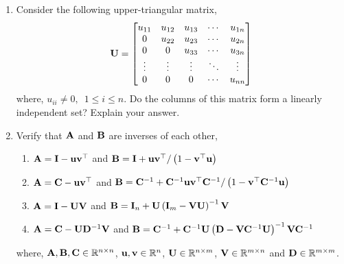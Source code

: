 \begin{enumerate}
    \item Consider the following upper-triangular matrix, 
    \[ \mathbf{U} = \begin{bmatrix}
    u_{11} & u_{12} & u_{13} & \cdots & u_{1n}\\
    0 & u_{22} & u_{23} & \cdots & u_{2n}\\
    0 & 0 & u_{33} & \cdots & u_{3n}\\
    \vdots & \vdots & \vdots & \ddots & \vdots\\
    0 & 0 & 0 & \cdots & u_{nn}\\\end{bmatrix} \]
    where, $u_{ii} \neq 0, \,\,\, 1 \leq i \leq n$. Do the columns of this matrix form a linearly independent set? Explain your answer.

    \item Verify that $\mathbf{A}$ and $\mathbf{B}$ are inverses of each other,
    \begin{enumerate}
        \item $\mathbf{A} = \mathbf{I} - \mathbf{u}\mathbf{v}^\top$ and $\mathbf{B} = \mathbf{I} + \mathbf{u}\mathbf{v}^\top / \left( 1 - \mathbf{v}^\top\mathbf{u} \right)$
        \item $\mathbf{A} = \mathbf{C} - \mathbf{u}\mathbf{v}^\top$ and $\mathbf{B} = \mathbf{C}^{-1} + \mathbf{C}^{-1}\mathbf{u}\mathbf{v}^\top\mathbf{C}^{-1} / \left( 1 - \mathbf{v}^\top\mathbf{C}^{-1}\mathbf{u} \right)$
        \item $\mathbf{A} = \mathbf{I} - \mathbf{U}\mathbf{V}$ and $\mathbf{B} = \mathbf{I}_{n} + \mathbf{U}\left( \mathbf{I}_m - \mathbf{V}\mathbf{U}\right)^{-1}\mathbf{V}$
        \item $\mathbf{A} = \mathbf{C} - \mathbf{U}\mathbf{D}^{-1}\mathbf{V}$ and $\mathbf{B} = \mathbf{C}^{-1} + \mathbf{C}^{-1}\mathbf{U}\left( \mathbf{D} - \mathbf{V}\mathbf{C}^{-1}\mathbf{U}\right)^{-1}\mathbf{V}\mathbf{C}^{-1}$
    \end{enumerate}
    where, $\mathbf{A}, \mathbf{B}, \mathbf{C} \in \mathbb{R}^{n \times n}$, $\mathbf{u}, \mathbf{v} \in \mathbb{R}^n$, $\mathbf{U} \in \mathbb{R}^{n \times m}$, $\mathbf{V} \in \mathbb{R}^{m \times n}$ and $\mathbf{D} \in \mathbb{R}^{m \times m}$.
\end{enumerate}